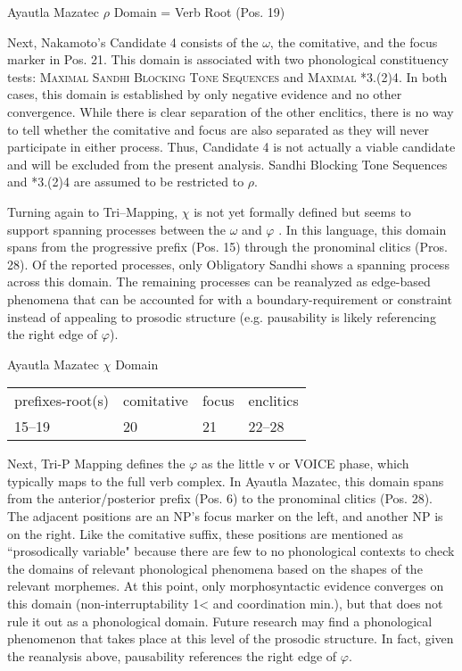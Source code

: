 \documentclass[output=paper]{langscibook}
\begin{document}
\ea
    {Ayautla Mazatec $\rho$ Domain = Verb Root (Pos. 19)}
\z

Next, Nakamoto's Candidate 4 consists of the $\omega$, the comitative, and the focus marker in Pos. 21. This domain is associated with two phonological constituency tests: {\textsc{Maximal Sandhi Blocking Tone Sequences}} and {\textsc{Maximal *3.(2)4}}. In both cases, this domain is established by only negative evidence and no other convergence. While there is clear separation of the other enclitics, there is no way to tell whether the comitative and focus are also separated as they will never participate in either process. Thus, Candidate 4 is not actually a viable candidate and will be excluded from the present analysis. Sandhi Blocking Tone Sequences and *3.(2)4 are assumed to be restricted to $\rho$. 

Turning again to Tri--Mapping, $\chi$ is not yet formally defined but seems to support spanning processes between the $\omega$ and $\varphi$ \citep{millersande:2021}. In this language, this domain spans from the progressive prefix (Pos. 15) through the pronominal clitics (Pros. 28). Of the reported processes, only Obligatory Sandhi shows a spanning process across this domain. The remaining processes can be reanalyzed as edge-based phenomena that can be accounted for with a boundary-requirement or constraint instead of appealing to prosodic structure (e.g. pausability is likely referencing the right edge of $\varphi$). 

\ea
    Ayautla Mazatec $\chi$ Domain \\
        \begin{tabular}{llll}
            prefixes-root(s) & comitative & focus & enclitics  \\
            15--19 & 20 & 21 & 22--28 
        \end{tabular}
\z

Next, Tri-P Mapping defines the $\varphi$ as the little v or VOICE phase, which typically maps to the full verb complex.  In Ayautla Mazatec, this domain spans from the anterior/posterior prefix (Pos. 6) to the pronominal clitics (Pos. 28). The adjacent positions are an NP's focus marker on the left, and another NP is on the right. Like the comitative suffix, these positions are mentioned as ``prosodically variable" because there are few to no phonological contexts to check the domains of relevant phonological phenomena based on the shapes of the relevant morphemes. At this point, only morphosyntactic evidence converges on this domain (non-interruptability 1< and coordination min.), but that does not rule it out as a phonological domain. Future research may find a phonological phenomenon that takes place at this level of the prosodic structure. In fact, given the reanalysis above, pausability references the right edge of $\varphi$.
\end{document}
